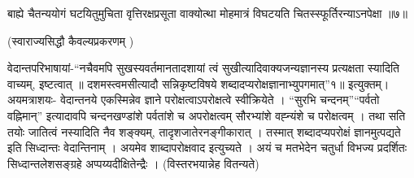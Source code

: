बाह्ये चैतन्ययोगं घटयितुमुचिता वृत्तिरक्षप्रसूता वाक्योत्था मोहमात्रं विघटयति चितस्स्फूर्तिरन्याऽनपेक्षा ॥७॥

(स्वाराज्यसिद्धौ कैवल्यप्रकरणम् )

वेदान्तपरिभाषायां-“नचैवमपि सुखस्यवर्तमानतादशायां त्वं सुखीत्यादिवाक्यजन्यज्ञानस्य प्रत्यक्षता स्यादिति वाच्यम्, इष्टत्वात् ॥ दशमस्त्वमसीत्यादौ सन्निकृष्टविषये शब्दादप्यरोक्षज्ञानाभ्युपगमात्”१॥ इत्युक्तम्। अयमत्राशयः- वेदान्तनये एकस्मिन्नेव ज्ञाने परोक्षत्वाऽपरोक्षत्वे स्वीक्रियेते । “सुरभि चन्दनम्”“पर्वतो वह्निमान्” इत्यादावपि चन्दनखण्डांशे पर्वतांशे च अपरोक्षत्वम्  सौरभ्यांशे वह्न्यंशे च परोक्षत्वम् । तथा सति तयोः जातित्वं नस्यादिति नैव शङ्क्यम्, तादृशजातेरनङ्गीकारात् । तस्मात् शब्दादप्यपरोक्षं ज्ञानमुत्पद्यते इति सिध्दान्तः वेदान्तिनाम् । अयमेव शाब्दापरोक्षवाद इत्युच्यते । अयं च मतभेदेन चतुर्धा विभज्य प्रदर्शितः सिध्दान्तलेशसङ्ग्रहे अप्पय्यदीक्षितेन्द्रैः । (विस्तरभयान्नेह वितन्यते)

\articleend
